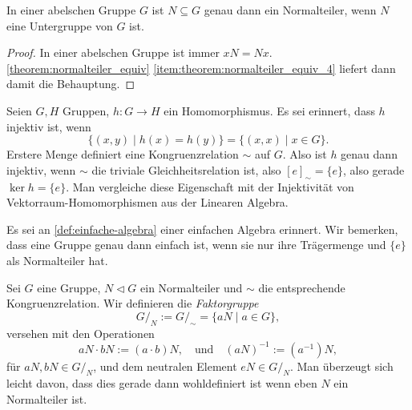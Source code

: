 \begin{corollary} \label{corollary:abelsch-normalteiler-untergruppe}
    In einer abelschen Gruppe $G$ ist $N \subseteq G$ genau dann ein Normalteiler, wenn $N$ eine Untergruppe von $G$ ist.
\end{corollary}
\begin{proof}
    In einer abelschen Gruppe ist immer $xN = Nx$. \cref{theorem:normalteiler_equiv} \ref*{item:theorem:normalteiler_equiv_4} liefert dann damit die Behauptung.
\end{proof}


\begin{remark} \label{remark:gruppe-injektiv-kern-trivial}
    Seien $G, H$ Gruppen, $h : G \to H$ ein Homomorphismus. Es sei erinnert, dass $h$ injektiv ist, wenn
    $$ \{ (x,y) \mid h(x) = h(y) \} = \{ (x,x) \mid x \in G \}. $$
    Erstere Menge definiert eine Kongruenzrelation $\sim$ auf $G$. Also ist $h$ genau dann injektiv, wenn $\sim$ die triviale Gleichheitsrelation ist, also $[e]_\sim = \{e\}$, also gerade $\ker h = \{ e \}$. Man vergleiche diese Eigenschaft mit der Injektivität von Vektorraum-Homomorphismen aus der Linearen Algebra.
\end{remark}

\begin{remark}
    Es sei an \cref{def:einfache-algebra} einer einfachen Algebra erinnert. Wir bemerken, dass eine Gruppe genau dann einfach ist, wenn sie nur ihre Trägermenge und $\{e\}$ als Normalteiler hat.
\end{remark}

\begin{definition}
    Sei $G$ eine Gruppe, $N \vartriangleleft G$ ein Normalteiler und $\sim$ die entsprechende Kongruenzrelation. Wir definieren die \emph{Faktorgruppe} 
    $$ G /_N := G /_\sim = \{ aN \mid a \in G \}, $$
    versehen mit den Operationen
    $$  aN \cdot bN := (a \cdot b)N, \quad \textrm{und} \quad (aN)^{-1} := (a^{-1}) N, $$
    für $aN, bN \in G /_N$, und dem neutralen Element $eN \in G /_N$.
    Man überzeugt sich leicht davon, dass dies gerade dann wohldefiniert ist wenn eben $N$ ein Normalteiler ist.
\end{definition}

